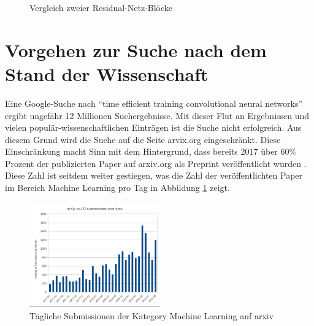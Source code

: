 \begin{figure}[h]
 \centering
 \qquad
       \caption{Vergleich zweier Residual-Netz-Blöcke \cite{resnet}}
\end{figure}


\section{Vorgehen zur Suche nach dem Stand der Wissenschaft}\label{sec:suche}
Eine Google-Suche nach ``time efficient training convolutional neural networks'' ergibt ungefähr 12 Millionen Suchergebnisse. Mit dieser Flut an Ergebnissen und vielen populär-wissenschaftlichen Einträgen ist die Suche nicht erfolgreich. Aus diesem Grund wird die Suche auf die Seite arvix.org eingeschränkt. Diese Einschränkung macht Sinn mit dem Hintergrund, dass bereits 2017 über 60\% Prozent der publizierten Paper auf arxiv.org als Preprint veröffentlicht wurden \cite{popular}. Diese Zahl ist seitdem weiter gestiegen, was die Zahl der veröffentlichten Paper im Bereich Machine Learning pro Tag in Abbildung \ref{abb:arxiv} zeigt.

\begin{figure}[h]
 \centering
 \includegraphics[width=0.5\textwidth]{KapitelPartA/images/arxiv.png}
 \caption{Tägliche Submissionen der Kategory Machine Learning auf arxiv \cite{cornell}}
 \label{abb:arxiv}
\end{figure}


